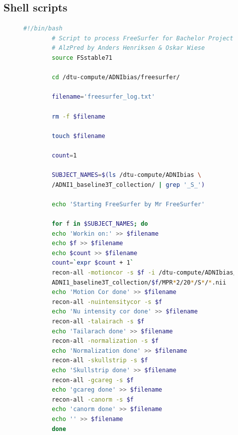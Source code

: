 \documentclass[12pt, fleqn, titlepage]{article}
\newcommand{\1}[1]{\mathds{1}\left[#1\right]}
\newcommand\pythonstyle{\lstset{
		language=Python,
		tabsize=2,
		basicstyle=\ttm,
		morekeywords={self},              %
		keywordstyle=\ttb\color{deepblue},
		emph={MyClass,__init__},          %
		emphstyle=\ttb\color{deepred},    %
		stringstyle=\color{deepgreen},
		frame=tb,                         %
		showstringspaces=false,
		literate={\ \ }{{\ }}1
}}
\newcommand\pythonexternal[2][]{{
\pythonstyle
}}
\begin{document}
%
%
%
%

\subsection{Shell scripts}
\begin{figure}[H]
	\scriptsize
	\begin{lstlisting}[language=bash,caption={FreeSurfer Preprocessing}]
		#!/bin/bash 
		# Script to process FreeSurfer for Bachelor Project:
		# AlzPred by Anders Henriksen & Oskar Wiese
		source FSstable71
		
		cd /dtu-compute/ADNIbias/freesurfer/
		
		filename='freesurfer_log.txt'
		
		rm -f $filename
		
		touch $filename
		
		count=1
		
		SUBJECT_NAMES=$(ls /dtu-compute/ADNIbias \ 
		/ADNI1_baseline3T_collection/ | grep '_S_')
		
		echo 'Starting FreeSurfer by Mr FreeSurfer' 
		
		for f in $SUBJECT_NAMES; do
		echo 'Workin on:' >> $filename
		echo $f >> $filename
		echo $count >> $filename 
		count=`expr $count + 1`
		recon-all -motioncor -s $f -i /dtu-compute/ADNIbias/ \
		ADNI1_baseline3T_collection/$f/MPR*2/20*/S*/*.nii 
		echo 'Motion Cor done' >> $filename
		recon-all -nuintensitycor -s $f  
		echo 'Nu intensity cor done' >> $filename
		recon-all -talairach -s $f 
		echo 'Tailarach done' >> $filename
		recon-all -normalization -s $f 
		echo 'Normalization done' >> $filename
		recon-all -skullstrip -s $f     
		echo 'Skullstrip done' >> $filename
		recon-all -gcareg -s $f  
		echo 'gcareg done' >> $filename
		recon-all -canorm -s $f  
		echo 'canorm done' >> $filename
		echo '' >> $filename
		done 
		
	\end{lstlisting}
	\caption{}
	\label{script1}
\end{figure}
\end{document}
